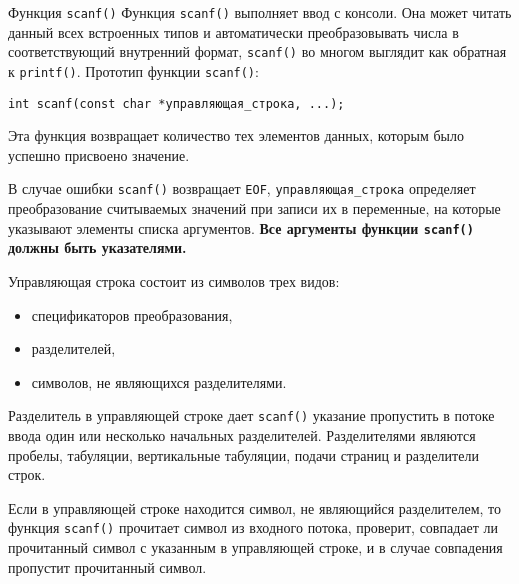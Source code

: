 \documentclass[xcolor=table]{beamer}
\begin{document}
\begin{frame}{Функция \texttt{scanf()}}
    Функция \texttt{scanf()} выполняет ввод с консоли. Она может читать данный всех встроенных типов и автоматически преобразовывать числа в соответствующий внутренний формат, \texttt{scanf()} во многом выглядит как обратная к \texttt{printf()}. Прототип функции \texttt{scanf()}:
    
    \begin{alltt}
    % \textcolor{red}{
    \texttt{int scanf(const char *управляющая\_строка, ...);}
    % }
    \end{alltt}
    
    Эта функция возвращает количество тех элементов данных, которым было успешно присвоено значение.
    
    В случае ошибки \texttt{scanf()} возвращает \texttt{EOF}, \texttt{управляющая\_строка} определяет преобразование считываемых значений при записи их в переменные, на которые указывают элементы списка аргументов. \textbf{Все аргументы функции \texttt{scanf()} должны быть указателями.}
    
    Управляющая строка состоит из символов трех видов:
    \begin{itemize}
        \item спецификаторов преобразования,
        \item разделителей,
        \item символов, не являющихся разделителями.
    \end{itemize}
    
    Разделитель в управляющей строке дает \texttt{scanf()} указание пропустить в потоке ввода один или несколько начальных разделителей. Разделителями являются пробелы, табуляции, вертикальные табуляции, подачи страниц и разделители строк.
    
    Если в управляющей строке находится символ, не являющийся разделителем, то функция \texttt{scanf()} прочитает символ из входного потока, проверит, совпадает ли прочитанный символ с указанным в управляющей строке, и в случае совпадения пропустит прочитанный символ.
\end{frame}
\end{document}
